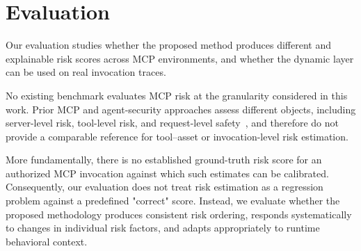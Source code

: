 \documentclass[sigconf]{acmart}
\begin{document}

\section{Evaluation}
\label{sec:evaluation}

Our evaluation studies whether the proposed method produces different and
explainable risk scores across MCP environments, and whether the dynamic layer
can be used on real invocation traces.

No existing benchmark evaluates MCP risk at the granularity considered in this work. Prior MCP and agent-security approaches assess different objects, including server-level risk, tool-level risk, and request-level safety~\cite{kumar2026mcpinsos,betser2026agentrim,zhang2026stars}, and therefore do not provide a comparable reference for tool--asset or invocation-level risk estimation. 

More fundamentally, there is no established ground-truth risk score for an authorized MCP invocation against which such estimates can be calibrated. Consequently, our evaluation does not treat risk estimation as a regression problem against a predefined "correct" score. Instead, we evaluate whether the proposed methodology produces consistent risk ordering, responds systematically to changes in individual risk factors, and adapts appropriately to runtime behavioral context.



\end{document}
